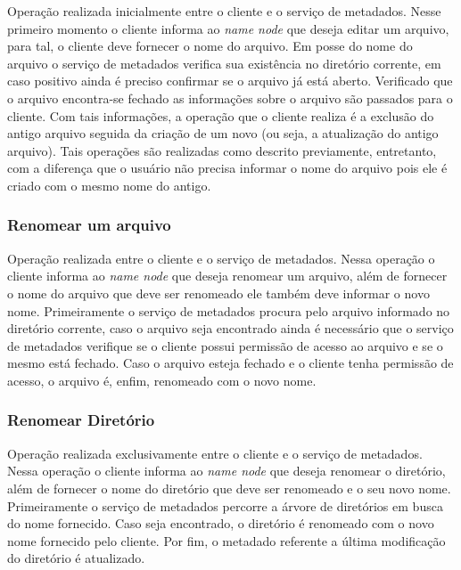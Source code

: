 Operação realizada inicialmente entre o cliente e o serviço de metadados. Nesse primeiro momento o cliente informa ao \textit{name node} que deseja editar um arquivo, para tal, o cliente deve fornecer o nome do arquivo. Em posse do nome do arquivo o serviço de metadados verifica sua existência no diretório corrente, em caso positivo ainda é preciso confirmar se o arquivo já está aberto. Verificado que o arquivo encontra-se fechado as informações sobre o arquivo são passados para o cliente. Com tais informações, a operação que o cliente realiza é a exclusão do antigo arquivo seguida da criação de um novo (ou seja, a atualização do antigo arquivo). Tais operações são realizadas como descrito previamente, entretanto, com a diferença que o usuário não precisa informar o nome do arquivo pois ele é criado com o mesmo nome do antigo.
\\

\subsubsection{Renomear um arquivo}
Operação realizada entre o cliente e o serviço de metadados. Nessa operação o cliente informa ao \textit{name node} que deseja renomear um arquivo, além de fornecer o nome do arquivo que deve ser renomeado ele também deve informar o novo nome. Primeiramente o serviço de metadados procura pelo arquivo informado no diretório corrente, caso o arquivo seja encontrado ainda é necessário que o serviço de metadados verifique se o cliente possui permissão de acesso ao arquivo e se o mesmo está fechado. Caso o arquivo esteja fechado e o cliente tenha permissão de acesso, o arquivo é, enfim, renomeado com o novo nome.
\\

\subsubsection{Renomear Diretório}

Operação realizada exclusivamente entre o cliente e o serviço de metadados. Nessa operação o cliente informa ao \textit{name node} que deseja renomear o diretório, além de fornecer o nome do diretório que deve ser renomeado e o seu novo nome. Primeiramente o serviço de metadados percorre a árvore de diretórios em busca do nome fornecido. Caso seja encontrado, o diretório é renomeado com o novo nome fornecido pelo cliente. Por fim, o metadado referente a última modificação do diretório é atualizado.
\\

